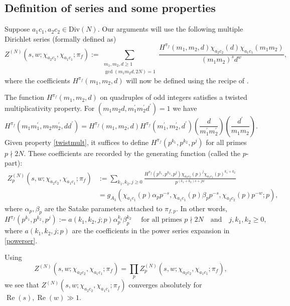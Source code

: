\documentclass[12pt,reqno]{amsart}
\theoremstyle{plain}
\theoremstyle{remark}
\renewcommand{\Re}{\operatorname{Re}}
\numberwithin{equation}{section}
\numberwithin{lemma}{section}
\numberwithin{theorem}{section}
\numberwithin{prop}{section}
\numberwithin{remark}{section}
\newcommand{\pfrac}[2]{\left(\frac{#1}{#2}\right)}
\begin{document}
\subsection{Definition of series and some properties} \label{mdsdef}
Suppose $a_1 c_1, a_2 c_2 \in \text{Div}(N)$.
Our arguments will use the following multiple Dirichlet series (formally defined as) 
\begin{equation} \label{multidir}
Z^{(N)}(s,w;\chi_{a_2 c_2},\chi_{a_1 c_1};\pi_f):=\sum_{\substack{m_1,m_2,d \geq 1 \\ \gcd(m_1 m_2 d,2N)=1}}
\frac{H^{\pi_f}(m_1,m_2,d) \chi_{a_2 c_2}(d) \chi_{a_1 c_1}(m_1 m_2)}{(m_1 m_2)^{s} d^{w} },
\end{equation}
where the coefficients $H^{\pi_f}(m_1,m_2,d)$ will now be defined using the recipe of 
\cite[Section~4]{CG1}. 

The function $H^{\pi_f}(m_1,m_2,d)$ on quadruples of odd integers satisfies a twisted multiplicativity 
property. For $(m_1 m_2 d, m_1^{\prime} m_2^{\prime} d^{\prime})=1$ we have 
\begin{equation} \label{twistmult}
H^{\pi_f}(m_1 m_1^{\prime}, m_2 m_2^{\prime}, d d^{\prime})=H^{\pi_f}(m_1,m_2,d) H^{\pi_f}(m_1^{\prime},m_2^{\prime},d^{\prime}) 
\pfrac{d}{m_1^{\prime} m_2^{\prime}}  \pfrac{d^{\prime}}{m_1 m_2}.
\end{equation}
Given property \eqref{twistmult}, it suffices to define $H^{\pi_f}(p^{k_1},p^{k_2},p^{j})$ for all primes $p \nmid 2N$. 
These coefficients are recorded by the generating function (called the $p$-part):
\begin{align*}
Z_p^{(N)}(s,w;\chi_{a_2 c_2},\chi_{a_1 c_1};\pi_{f})&:=\sum_{k_1,k_2,j \geq 0} \frac{H^{\pi_f}(p^{k_1},p^{k_2},p^j) \chi_{a_2 c_2}(p)^{j} 
\chi_{a_1 c_1}(p)^{k_1+k_2}}{p^{(k_1+k_2)s+jw}} \nonumber \\
&=g_{A_3} \left(\chi_{a_1 c_1}(p) \alpha_p p^{-s}, \chi_{a_1 c_1}(p) \beta_p p^{-s}, \chi_{a_2 c_2}(p) p^{-w};p \right),
\end{align*}
where $\alpha_p, \beta_p$ are 
the Satake parameters attached to $\pi_{f,p}$.
In other words,
\begin{equation} \label{primepower}
H^{\pi_f}(p^{k_1},p^{k_2},p^{j}):=a(k_1,k_2,j;p) \alpha_p^{k_1} 
   \beta_p^{k_2} \quad  \text{ for all primes } p \nmid 2N \quad \text{and}  \quad j,k_1,k_2 \geq 0,
\end{equation}
where $a(k_1,k_2,j;p)$ are the coefficients in the power series expansion in \eqref{powerser}.

Using
\begin{equation*}
Z^{(N)}(s,w;\chi_{a_2 c_2},\chi_{a_1 c_1};\pi_f)=\prod_p Z^{(N)}_p(s,w;\chi_{a_2 c_2},\chi_{a_1 c_1};\pi_f),
\end{equation*}
we see that $Z^{(N)}(s,w;\chi_{a_2 c_2},\chi_{a_1 c_1};\pi_f)$ converges absolutely 
for $\Re(s),\Re(w) \gg 1$. 
\end{document}
